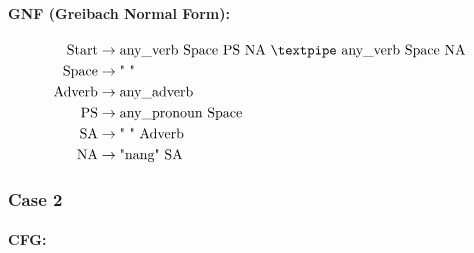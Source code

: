 \paragraph{GNF (Greibach Normal Form):}

\begin{equation*}
    \begin{aligned}
        \text{Start} &\rightarrow \text{any\_verb Space PS NA {\textpipe} any\_verb Space NA} \\
        \text{Space} &\rightarrow \text{" "} \\
        \text{Adverb} &\rightarrow \text{any\_adverb} \\
        \text{PS} &\rightarrow \text{any\_pronoun Space} \\
        \text{SA} &\rightarrow \text{" " Adverb} \\
        \text{NA} &\rightarrow \text{"nang" SA}
    \end{aligned}
\end{equation*}

\subsubsection{Case 2}

\paragraph{CFG:}